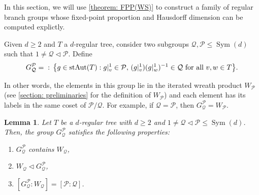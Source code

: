 \documentclass{amsart}
\def\set#1{{\def\st{\;:\;}\left\{#1\right\}}}
\DeclareMathOperator{\Aut}{Aut}
\DeclareMathOperator{\Sym}{Sym}
\DeclareMathOperator{\st}{st}
\newtheorem{Lemma}[Proposition]{Lemma}
\begin{document}
In this section, we will use \cref{theorem: FPP(WS)} to construct a family of regular branch groups whose fixed-point proportion and Hausdorff dimension can be computed explictly.

Given $d \geq 2$ and $T$ a $d$-regular tree, consider two subgroups $\mathcal{Q}, \mathcal{P} \leq \Sym(d)$ such that $1 \neq \mathcal{Q} \lhd \mathcal{P}$. Define $$G_\mathcal{Q}^\mathcal{P} = \set{g \in \Aut(T): g|_v^1 \in \mathcal{P}, \, (g|_v^1)(g|_w^1)^{-1} \in \mathcal{Q} \text{ for all $v,w \in T$}}.$$ 

In other words, the elements in this group lie in the iterated wreath product $W_\mathcal{P}$ (see \cref{section: preliminaries} for the definition of $W_\mathcal{P}$) and each element has its labels in the same coset of $\mathcal{P}/\mathcal{Q}$. For example, if $\mathcal{Q} = \mathcal{P}$, then $G_\mathcal{Q}^\mathcal{P} = W_\mathcal{P}$.


\begin{Lemma}
Let $T$ be a $d$-regular tree with $d \geq 2$ and $1 \neq \mathcal{Q} \lhd \mathcal{P} \leq \Sym(d)$. Then, the group $G_\mathcal{Q}^\mathcal{P}$ satisfies the following properties:
\begin{enumerate}
\item $G_\mathcal{Q}^\mathcal{P}$ contains $W_\mathcal{Q}$,
\item $W_\mathcal{Q} \lhd G_\mathcal{Q}^\mathcal{P}$,
\item $[G_\mathcal{Q}^\mathcal{P} : W_\mathcal{Q}] = [\mathcal{P}: \mathcal{Q}]$.
\end{enumerate}
\label{lemma: GQP group and index}
\end{Lemma}
\end{document}
